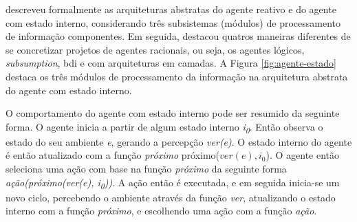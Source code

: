     \begin{figure}[h!]
        \centering
    \end{figure}
    

     descreveu formalmente as arquiteturas abstratas do agente reativo e do agente com estado interno, considerando três subsistemas (módulos) de processamento de informação componentes. Em seguida, destacou quatros maneiras diferentes de se concretizar projetos de agentes racionais, ou seja, os agentes lógicos, \textit{subsumption}, \acrshort{bdi} e com arquiteturas em camadas. A Figura \ref{fig:agente-estado} destaca os três módulos de processamento da informação na arquitetura abstrata do agente com estado interno.
    
    \begin{figure}[h!]
        \centering
    \end{figure}
    
    O comportamento do agente com estado interno pode ser resumido da seguinte forma. O agente inicia a partir de algum estado interno \emph{i\textsubscript{0}}. Então observa o estado do seu ambiente \emph{e}, gerando a percepção \emph{ver(e)}. O estado interno do agente é então atualizado com a função \emph{próximo} próximo($ver(e), i_0$). O agente então seleciona uma ação com base na função \emph{próximo} da seguinte forma \emph{ação(próximo(ver(e), i\textsubscript{0}))}. A ação então é executada, e em seguida inicia-se um novo ciclo, percebendo o ambiente através da função \emph{ver}, atualizando o estado interno com a função \emph{próximo}, e escolhendo uma ação com a função \emph{ação}. 

